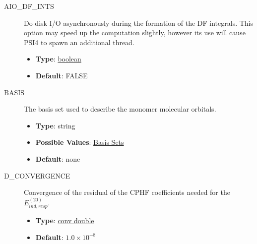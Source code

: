 \documentclass[letterpaper,10pt,english]{sphinxmanual}
\begin{document}
\begin{description}
\item[{AIO\_DF\_INTS}] \leavevmode{}\label{index:term-21}
Do disk I/O asynchronously during the formation of the DF integrals.
This option may speed up the computation slightly, however its use
will cause PSI4 to spawn an additional thread.
\begin{itemize}
\item {} 
\textbf{Type}: {\hyperref[index:boolean]{boolean}}

\item {} 
\textbf{Default}: FALSE

\end{itemize}

\end{description}
\begin{description}
\item[{BASIS}] \leavevmode{}\label{index:term-22}
The basis set used to describe the monomer molecular orbitals.
\begin{itemize}
\item {} 
\textbf{Type}: string

\item {} 
\textbf{Possible Values}: \href{http://sirius.chem.vt.edu/trac/wiki/InstalledBasisSets}{Basis Sets}

\item {} 
\textbf{Default}: none

\end{itemize}

\end{description}
\begin{description}
\item[{D\_CONVERGENCE}] \leavevmode{}\label{index:term-23}
Convergence of the residual of the CPHF coefficients needed for
the $E_{ind,resp}^{(20)}$.
\begin{itemize}
\item {} 
\textbf{Type}: {\hyperref[index:conv-double]{conv double}}

\item {} 
\textbf{Default}: $1.0 \times 10^{-8}$

\end{itemize}

\end{description}
\end{document}

